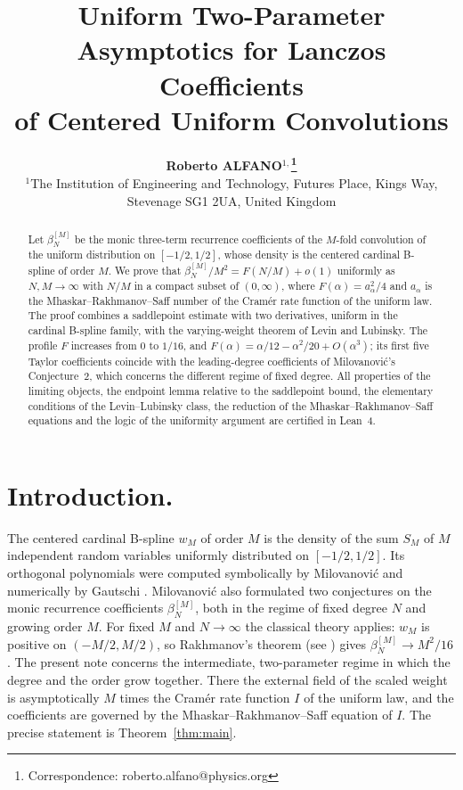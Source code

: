 \documentclass{math}
\title{Uniform Two-Parameter Asymptotics for Lanczos Coefficients\\[4pt] of Centered Uniform Convolutions}
\author[ALFANO]{\textbf{Roberto ALFANO$^{1,}$\thanks{Correspondence: roberto.alfano@physics.org}}\\[7pt]
$^{1}$The Institution of Engineering and Technology, Futures Place, Kings Way, Stevenage SG1 2UA, United Kingdom\\[\dimexpr1.7em+3pt\relax]
\rec{}\acc{}\finv{}}
\begin{document}
\maketitle
\begin{abstract}
Let $\beta_N^{[M]}$ be the monic three-term recurrence coefficients of the $M$-fold convolution of the uniform distribution on $[-1/2,1/2]$, whose density is the centered cardinal B-spline of order $M$. We prove that $\beta_N^{[M]}/M^2=F(N/M)+o(1)$ uniformly as $N,M\to\infty$ with $N/M$ in a compact subset of $(0,\infty)$, where $F(\alpha)=a_\alpha^2/4$ and $a_\alpha$ is the Mhaskar--Rakhmanov--Saff number of the Cram\'er rate function of the uniform law. The proof combines a saddlepoint estimate with two derivatives, uniform in the cardinal B-spline family, with the varying-weight theorem of Levin and Lubinsky. The profile $F$ increases from $0$ to $1/16$, and $F(\alpha)=\alpha/12-\alpha^2/20+O(\alpha^3)$; its first five Taylor coefficients coincide with the leading-degree coefficients of Milovanovi\'c's Conjecture~2, which concerns the different regime of fixed degree. All properties of the limiting objects, the endpoint lemma relative to the saddlepoint bound, the elementary conditions of the Levin--Lubinsky class, the reduction of the Mhaskar--Rakhmanov--Saff equations and the logic of the uniformity argument are certified in Lean~4.
\par\kern4pt
\end{abstract}

\section{Introduction.}\label{sec:intro}
The centered cardinal B-spline $w_M$ of order $M$ is the density of the sum $S_M$ of $M$ independent random variables uniformly distributed on $[-1/2,1/2]$. Its orthogonal polynomials were computed symbolically by Milovanovi\'c \cite{milovanovic2017} and numerically by Gautschi \cite{gautschi2017}. Milovanovi\'c also formulated two conjectures on the monic recurrence coefficients $\beta_N^{[M]}$, both in the regime of fixed degree $N$ and growing order $M$. For fixed $M$ and $N\to\infty$ the classical theory applies: $w_M$ is positive on $(-M/2,M/2)$, so Rakhmanov's theorem (see \cite{denisov2004}) gives $\beta_N^{[M]}\to M^2/16$. The present note concerns the intermediate, two-parameter regime in which the degree and the order grow together. There the external field of the scaled weight is asymptotically $M$ times the Cram\'er rate function $I$ of the uniform law, and the coefficients are governed by the Mhaskar--Rakhmanov--Saff equation of $I$. The precise statement is Theorem~\ref{thm:main}.
\end{document}
